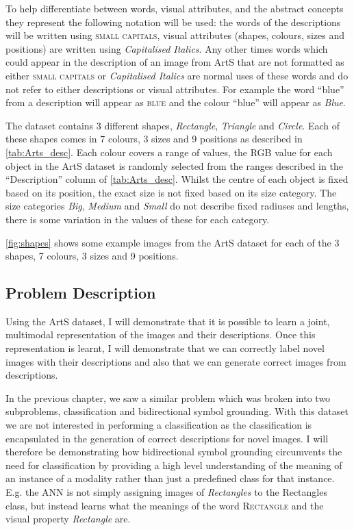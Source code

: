 To help differentiate between words, visual attributes, and the abstract concepts they represent the following notation will be used: the words of the descriptions will be written using \textsc{small capitals}, visual attributes (shapes, colours, sizes and positions) are written using \textit{Capitalised Italics}. Any other times words which could appear in the description of an image from ArtS that are not formatted as either \textsc{small capitals} or \textit{Capitalised Italics} are normal uses of these words and do not refer to either descriptions or visual attributes.
For example the word ``blue'' from a description will appear as \textsc{blue} and the colour ``blue'' will appear as \textit{Blue}. 


The dataset contains 3 different shapes, \textit{Rectangle}, \textit{Triangle} and \textit{Circle}. Each of these shapes comes in 7 colours, 3 sizes and 9 positions as described in \autoref{tab:Arts_desc}. Each colour covers a range of values, the \ac{RGB} value for each object in the ArtS dataset is randomly selected from the ranges described in the ``Description'' column of \autoref{tab:Arts_desc}. Whilst the centre of each object is fixed based on its position, the exact size is not fixed based on its size category. The size categories \textit{Big}, \textit{Medium} and \textit{Small} do not describe fixed radiuses and lengths, there is some variation in the values of these for each category.


\autoref{fig:shapes} shows some example images from the ArtS dataset for each of the 3 shapes, 7 colours, 3 sizes and 9 positions.

\subsection{Problem Description}
Using the ArtS dataset, I will demonstrate that it is possible to learn a joint, multimodal representation of the images and their descriptions. Once this representation is learnt, I will demonstrate that we can correctly label novel images with their descriptions and also that we can generate correct images from descriptions.

In the previous chapter, we saw a similar problem which was broken into two subproblems, classification and bidirectional symbol grounding. With this dataset we are not interested in performing a classification as the classification is encapsulated in the generation of correct descriptions for novel images. I will therefore be demonstrating how bidirectional symbol grounding circumvents the need for classification by providing a high level understanding of the meaning of an instance of a modality rather than just a predefined class for that instance. E.g. the \ac{ANN} is not simply assigning images of \textit{Rectangles} to the Rectangles class, but instead learns what the meanings of the word \textsc{Rectangle} and the visual property \textit{Rectangle} are. 


